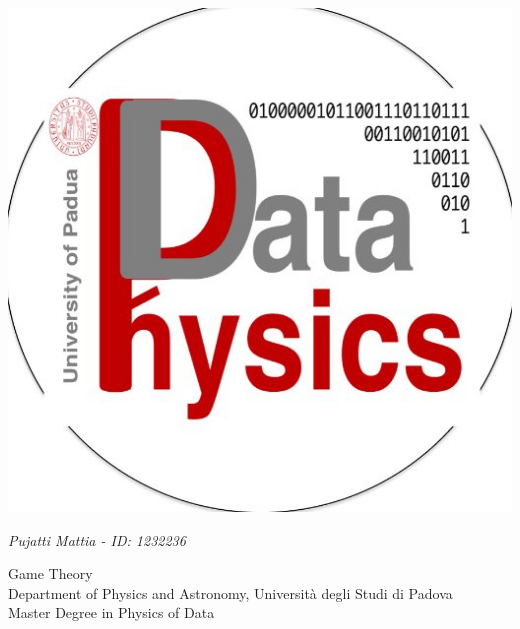 \hfill

\thispagestyle{titlestyle}
\begin{minipage}{0.15\textwidth}
	\includegraphics[width=\textwidth]{pictures/LogoPOD.jpg} 
\end{minipage}
\hspace{25pt}
\begin{minipage}{0.75\textwidth}
	
	\Large{\textbf{\reporttitle}} 
	\vspace{4mm}
	
	\large{\textit{Pujatti Mattia - ID: 1232236}}
	\vspace{2mm}
	
	Game Theory\\
	Department of Physics and Astronomy, Università degli Studi di Padova\\
	Master Degree in Physics of Data\\
	\vspace{1mm} 
	
	\deliverydate\\
	
\end{minipage}


